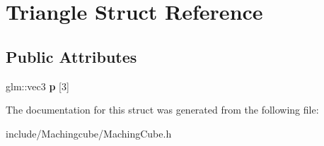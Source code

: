 \hypertarget{structTriangle}{}\section{Triangle Struct Reference}
\label{structTriangle}
\subsection*{Public Attributes}
\begin{DoxyCompactItemize}
\item 
glm\+::vec3 {\bfseries p} \mbox{[}3\mbox{]}\hypertarget{structTriangle_ac3a1057b5d33cb8818e3d7f541b54091}{}\label{structTriangle_ac3a1057b5d33cb8818e3d7f541b54091}

\end{DoxyCompactItemize}


The documentation for this struct was generated from the following file\+:\begin{DoxyCompactItemize}
\item 
include/\+Machingcube/Maching\+Cube.\+h\end{DoxyCompactItemize}
